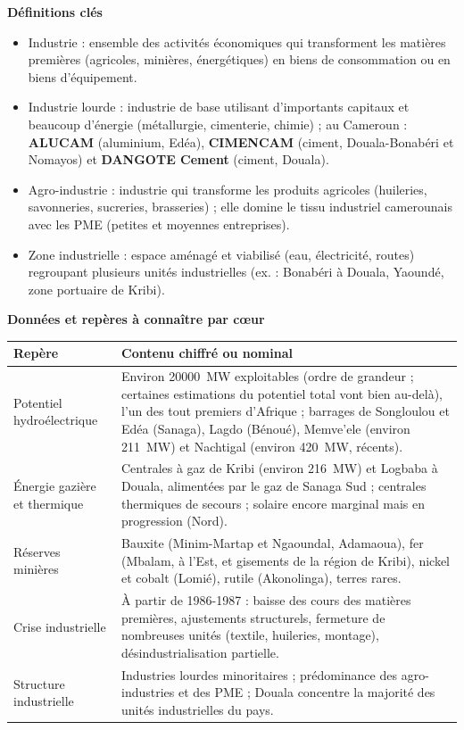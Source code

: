 \documentclass[11pt]{article}
\newcommand{\cle}[1]{{\popxbold\color{popdark}#1}}
\begin{document}
\begin{aretenir}
\textbf{Définitions clés}
\begin{itemize}
  \item \cle{Industrie} : ensemble des activités économiques qui transforment les matières premières (agricoles, minières, énergétiques) en biens de consommation ou en biens d'équipement.
  \item \cle{Industrie lourde} : industrie de base utilisant d'importants capitaux et beaucoup d'énergie (métallurgie, cimenterie, chimie) ; au Cameroun : \textbf{ALUCAM} (aluminium, Edéa), \textbf{CIMENCAM} (ciment, Douala-Bonabéri et Nomayos) et \textbf{DANGOTE Cement} (ciment, Douala).
  \item \cle{Agro-industrie} : industrie qui transforme les produits agricoles (huileries, savonneries, sucreries, brasseries) ; elle domine le tissu industriel camerounais avec les \cle{PME} (petites et moyennes entreprises).
  \item \cle{Zone industrielle} : espace aménagé et viabilisé (eau, électricité, routes) regroupant plusieurs unités industrielles (ex. : Bonabéri à Douala, Yaoundé, zone portuaire de Kribi).
\end{itemize}

\textbf{Données et repères à connaître par cœur}
\begin{center}
\begin{tabularx}{\linewidth}{|l|X|}\hline
\rowcolor{popblueL} \textbf{Repère} & \textbf{Contenu chiffré ou nominal} \\ \hline
Potentiel hydroélectrique & Environ \SI{20000}{MW} exploitables (ordre de grandeur ; certaines estimations du potentiel total vont bien au-delà), l'un des tout premiers d'Afrique ; barrages de Songloulou et Edéa (Sanaga), Lagdo (Bénoué), Memve'ele (environ \SI{211}{MW}) et Nachtigal (environ \SI{420}{MW}, récents). \\ \hline
Énergie gazière et thermique & Centrales à gaz de Kribi (environ \SI{216}{MW}) et Logbaba à Douala, alimentées par le gaz de Sanaga Sud ; centrales thermiques de secours ; solaire encore marginal mais en progression (Nord). \\ \hline
Réserves minières & Bauxite (Minim-Martap et Ngaoundal, Adamaoua), fer (Mbalam, à l'Est, et gisements de la région de Kribi), nickel et cobalt (Lomié), rutile (Akonolinga), terres rares. \\ \hline
Crise industrielle & À partir de 1986-1987 : baisse des cours des matières premières, ajustements structurels, fermeture de nombreuses unités (textile, huileries, montage), désindustrialisation partielle. \\ \hline
Structure industrielle & Industries lourdes minoritaires ; prédominance des agro-industries et des PME ; Douala concentre la majorité des unités industrielles du pays. \\ \hline
\end{tabularx}
\end{center}


\end{aretenir}
\end{document}
